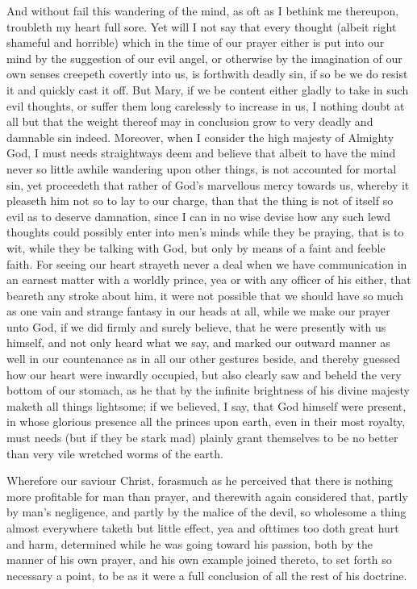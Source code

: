 \documentclass[a5paper]{scrbook}
\begin{document}
	And without fail this wandering of the mind, as oft as I bethink me thereupon, troubleth my heart full sore. Yet will I not say that every thought (albeit right shameful and horrible) which in the time of our prayer either is put into our mind by the suggestion of our evil angel, or otherwise by the imagination of our own senses creepeth covertly into us, is forthwith deadly sin, if so be we do resist it and quickly cast it off. But Mary, if we be content either gladly to take in such evil thoughts, or suffer them long carelessly to increase in us, I nothing doubt at all but that the weight thereof may in conclusion grow to very deadly and damnable sin indeed. Moreover, when I consider the high majesty of Almighty God, I must needs straightways deem and believe that albeit to have the mind never so little awhile wandering upon other things, is not accounted for mortal sin, yet proceedeth that rather of God's marvellous mercy towards us, whereby it pleaseth him not so to lay to our charge, than that the thing is not of itself so evil as to deserve damnation, since I can in no wise devise how any such lewd thoughts could possibly enter into men's minds while they be praying, that is to wit, while they be talking with God, but only by means of a faint and feeble faith. For seeing our heart strayeth never a deal when we have communication in an earnest matter with a worldly prince, yea or with any officer of his either, that beareth any stroke about him, it were not possible that we should have so much as one vain and strange fantasy in our heads at all, while we make our prayer unto God, if we did firmly and surely believe, that he were presently with us himself, and not only heard what we say, and marked our outward manner as well in our countenance as in all our other gestures beside, and thereby guessed how our heart were inwardly occupied, but also clearly saw and beheld the very bottom of our stomach, as he that by the infinite brightness of his divine majesty maketh all things lightsome; if we believed, I say, that God himself were present, in whose glorious presence all the princes upon earth, even in their most royalty, must needs (but if they be stark mad) plainly grant themselves to be no better than very vile wretched worms of the earth.
	
	Wherefore our saviour Christ, forasmuch as he perceived that there is nothing more profitable for man than prayer, and therewith again considered that, partly by man's negligence, and partly by the malice of the devil, so wholesome a thing almost everywhere taketh but little effect, yea and ofttimes too doth great hurt and harm, determined while he was going toward his passion, both by the manner of his own prayer, and his own example joined thereto, to set forth so necessary a point, to be as it were a full conclusion of all the rest of his doctrine.
	
\end{document}
